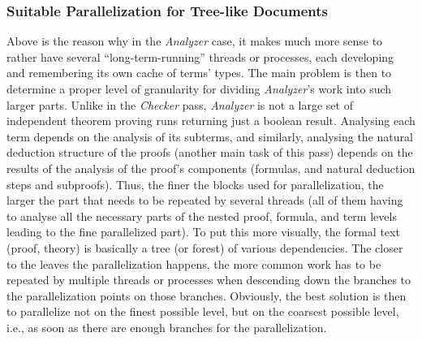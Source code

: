 \documentclass{llncs}
\begin{document}
\subsubsection{Suitable Parallelization for Tree-like Documents}
Above is the reason why in the \emph{Analyzer} case, it makes much more
sense to rather have several ``long-term-running'' threads or
processes, each developing and remembering its own cache of terms'
types. The main problem is then to determine a proper level of
granularity for dividing \emph{Analyzer}'s work into such larger
parts. Unlike in the \emph{Checker} pass, \emph{Analyzer} is not a
large set of independent theorem proving runs returning just a boolean
result. Analysing each term depends on the analysis of its subterms,
and similarly, analysing the natural deduction structure of the proofs
(another main task of this pass) depends on the results of the
analysis of the proof's components (formulas, and natural deduction
steps and subproofs).  Thus, the finer the blocks used for
parallelization, the larger the part that needs to be repeated by
several threads (all of them having to analyse all the necessary parts
of the nested proof, formula, and term levels leading to the fine
parallelized part). To put this more visually, the formal text (proof,
theory) is basically a tree (or forest) of various dependencies.  The
closer to the leaves the parallelization happens, the more common work
has to be repeated by multiple threads or processes when descending
down the branches to the parallelization points on those
branches. Obviously, the best solution is then to parallelize not on
the finest possible level, but on the coarsest possible level, i.e.,
as soon as there are enough branches for the parallelization.
\end{document}
